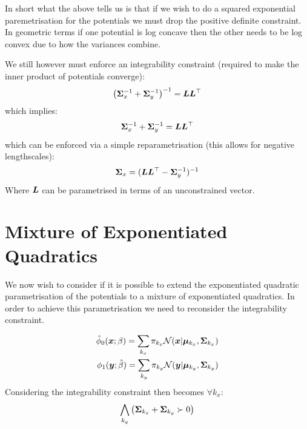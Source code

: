 \documentclass[a4paper,12pt,twoside,openright]{report}
\theoremstyle{definition}
\begin{document}
In short what the above tells us is that if we wish to do a squared exponential paremetrisation for the potentials we must drop the positive definite constraint. In geometric terms if one potential is log concave then the other needs to be log convex due to how the variances combine.

We still however must enforce an integrability constraint (required to make the inner product of potentials converge):
\begin{align*}
\left({\bm{\Sigma}}_x^{-1} +{\bm{\Sigma}}_y^{-1}\right)^{-1} = {\bm{L}}{\bm{L}}^{\top}
\end{align*}
which implies:
\begin{align*}
{\bm{\Sigma}}_x^{-1} +{\bm{\Sigma}}_y^{-1} = {\bm{L}}{\bm{L}}^{\top}
\end{align*}
which can be enforced via a simple reparametrisation (this allows for negative lengthscales):
\begin{align*}
{\bm{\Sigma}}_x = ({\bm{L}}{\bm{L}}^{\top} -{\bm{\Sigma}}_y^{-1})^{-1}
\end{align*}
Where ${\bm{L}}$ can be parametrised in terms of an unconstrained vector.
\section{Mixture of Exponentiated Quadratics}


We now wish to consider if it is possible to extend the exponentiated quadratic  parametrisation of the potentials to a mixture of exponentiated quadratics. In order to achieve this parametrisation we need to reconsider the integrability constraint.

\begin{align}
{\hat{\phi}}_0( {\bm{x}} ; \beta) =  \sum_{k_x} \pi_{k_x} {\mathcal{N}}({\bm{x}} | {\bm{\mu}}_{k_x}, {\bm{\Sigma}}_{k_x}) \\
\phi_1( {\bm{y}} ; \hat{\beta}) = \sum_{k_y} \pi_{k_y}  {\mathcal{N}}({\bm{y}} | {\bm{\mu}}_{k_y}, {\bm{\Sigma}}_{k_y}) 
\end{align}
Considering  the integrability constraint then becomes $\forall k_x$:
\begin{align*}
   \bigwedge_{k_y} \left({\bm{\Sigma}}_{k_x} +{\bm{\Sigma}}_{k_y} \succ 0\right) 
\end{align*}
\end{document}
